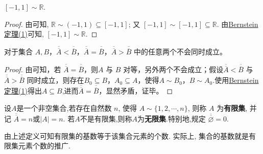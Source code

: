 \documentclass[../../main.tex]{subfiles}%
\begin{document}
\begin{example}\label{example:-1,1与R对等}
$[-1, 1] \sim \mathbb{R}$.
\end{example}
\begin{proof}

由可知, $\mathbb{R} \sim (-1, 1) \subseteq [-1, 1]$; 又 $[-1, 1] \sim [-1, 1] \subseteq \mathbb{R}$. 由\hyperref[theorem:Cantor-Bernstein定理]{Bernstein定理(1)}可知, $[-1, 1] \sim \mathbb{R}$.

\end{proof}

\begin{theorem}
对于集合 $A, B$，$\overline{\overline{A}} < \overline{\overline{B}}$，$\overline{\overline{A}} = \overline{\overline{B}}$，$\overline{\overline{A}} > \overline{\overline{B}}$ 中的任意两个不会同时成立。
\end{theorem}
\begin{proof}

由可知，若 $\overline{\overline{A}} = \overline{\overline{B}}$，则$A$ 与 $B$ 对等，另外两个不会成立；假设$\overline{\overline{A}} < \overline{\overline{B}}$ 与 $\overline{\overline{A}} > \overline{\overline{B}}$ 同时成立，则存在$B_0 \subseteq B$，$A_0 \subseteq A$，使得$A \sim B_0$，$B \sim A_0$.使用\hyperref[theorem:Cantor-Bernstein定理]{Bernstein定理(1)}得出$A \subseteq B$,进而$\overline{\overline{A}} = \overline{\overline{B}}$，显然矛盾，证毕。

\end{proof}

\begin{definition}[有限集与无限集]\label{definition:有限集与无限集}
设$A$是一个非空集合,若存在自然数 $n$, 使得 $A \sim \{1, 2, \cdots, n\}$, 则称 $A$ 为\textbf{有限集}, 并记 $\overline{\overline{A}} = n$或$|A|=n$. 若$A$不是有限集,则称$A$为\textbf{无限集}.特别地,规定 $\overline{\overline{\varnothing}} = 0$.
\end{definition}
\begin{note}
由上述定义可知有限集的基数等于该集合元素的个数. 实际上, 集合的基数就是有限集元素个数的推广.
\end{note}
\end{document}
